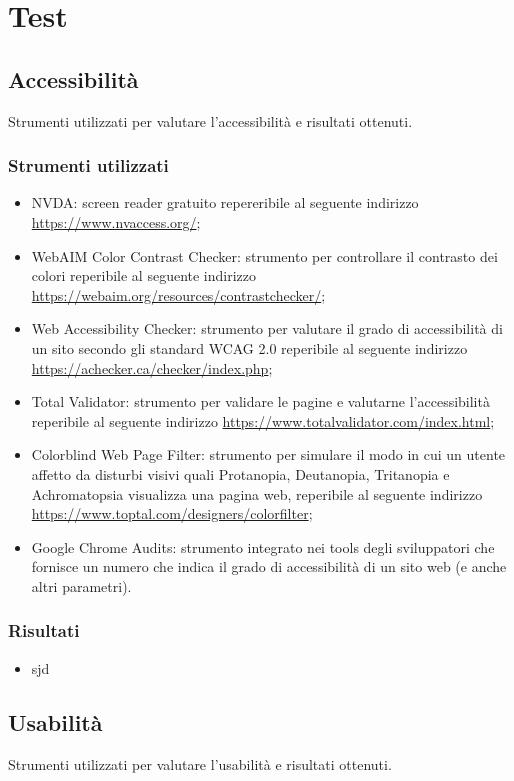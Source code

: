 \documentclass[12pt]{article}
\begin{document}
	\section{Test}
	\subsection{Accessibilità}
	Strumenti utilizzati per valutare l'accessibilità e risultati ottenuti.
	\subsubsection{Strumenti utilizzati}
		\begin{itemize}
			\item NVDA: screen reader gratuito repereribile al seguente indirizzo \url{https://www.nvaccess.org/};
			\item WebAIM Color Contrast Checker: strumento per controllare il contrasto dei colori reperibile al seguente indirizzo \url{https://webaim.org/resources/contrastchecker/};
			\item Web Accessibility Checker: strumento per valutare il grado di accessibilità di un sito secondo gli standard WCAG 2.0 reperibile al seguente indirizzo \url{https://achecker.ca/checker/index.php};
			\item Total Validator: strumento per validare le pagine e valutarne l'accessibilità reperibile al seguente indirizzo \url{https://www.totalvalidator.com/index.html};
			\item Colorblind Web Page Filter: strumento per simulare il modo in cui un utente affetto da disturbi visivi quali Protanopia, Deutanopia, Tritanopia e Achromatopsia visualizza una pagina web, reperibile al seguente indirizzo \url{https://www.toptal.com/designers/colorfilter};
			\item Google Chrome Audits: strumento integrato nei tools degli sviluppatori che fornisce un numero che indica il grado di accessibilità di un sito web (e anche altri parametri).
		\end{itemize}
	\subsubsection{Risultati}
		\begin{itemize}
			\item sjd
		\end{itemize}
	
	\subsection{Usabilità}
	Strumenti utilizzati per valutare l'usabilità e risultati ottenuti.
\end{document}
